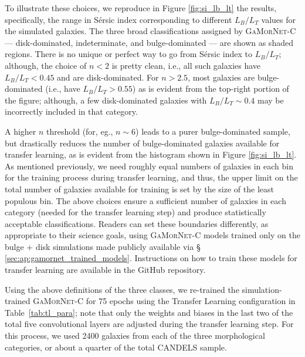 \documentclass[twocolumn]{aastex63}
\newcommand\sersic{S\'ersic}
\newcommand\gamornet{G\textsc{a}M\textsc{or}N\textsc{et}}
\begin{document}
To illustrate these choices, we reproduce in Figure \ref{fig:si_lb_lt} the \citet{simmons_08} results, specifically, the range in \sersic{} index corresponding to different $L_B/L_T$ values for the simulated galaxies. The three broad classifications assigned by \gamornet{}-C --- disk-dominated, indeterminate, and bulge-dominated --- are shown as shaded regions. There is no unique or perfect way to go from \sersic{} index to $L_B/L_T$; although, the choice of $n<2$ is pretty clean, i.e., all such galaxies have $L_B/L_T < 0.45$ and are disk-dominated. For $n>2.5$, most galaxies are bulge-dominated (i.e., have $L_B/L_T > 0.55$) as is evident from the top-right portion of the figure; although, a few disk-dominated galaxies with $L_B/L_T \sim 0.4$ may be incorrectly included in that category. 
    
A higher $n$ threshold (for, eg., $n\sim6$) leads to a purer bulge-dominated sample, but drastically reduces the number of bulge-dominated galaxies available for transfer learning, as is evident from the histogram shown in Figure \ref{fig:si_lb_lt}. As mentioned previously, we need roughly equal numbers of galaxies in each bin for the training process during transfer learning, and thus, the upper limit on the total number of galaxies available for training is set by the size of the least populous bin. The above choices ensure a sufficient number of galaxies in each category (needed for the transfer learning step) and produce statistically acceptable classifications. Readers can set these boundaries differently, as appropriate to their science goals, using \gamornet{}-C models trained only on the bulge + disk simulations made publicly available via \S\,\ref{sec:ap:gamornet_trained_models}. Instructions on how to train these models for transfer learning are available in the GitHub repository.
    
Using the above definitions of the three classes, we re-trained the simulation-trained \gamornet{}-C for 75 epochs using the Transfer Learning configuration in Table~\ref{tab:tl_para}; note that only the weights and biases in the last two of the total five convolutional layers are adjusted during the transfer learning step. For this process, we used 2400 galaxies from each of the three morphological categories, or about a quarter of the total CANDELS sample.
\end{document}
